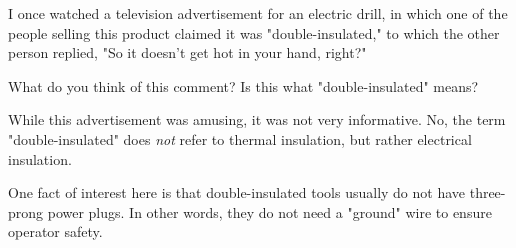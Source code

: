 

I once watched a television advertisement for an electric drill, in which one of the people selling this product claimed it was "double-insulated," to which the other person replied, "So it doesn't get hot in your hand, right?"

What do you think of this comment?  Is this what "double-insulated" means?







While this advertisement was amusing, it was not very informative.  No, the term "double-insulated" does {\it not} refer to thermal insulation, but rather electrical insulation.







One fact of interest here is that double-insulated tools usually do not have three-prong power plugs.  In other words, they do not need a "ground" wire to ensure operator safety.




